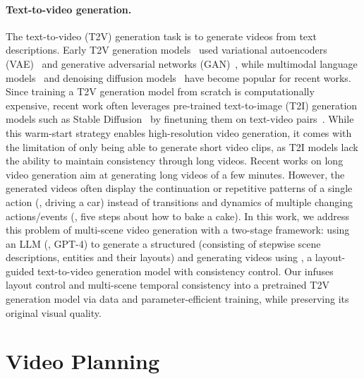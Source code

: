 \paragraph{Text-to-video generation.}
The text-to-video (T2V) generation task is to generate videos from text descriptions.
Early T2V generation models~\citep{li2017video, li2018storygan} used variational autoencoders (VAE)~\citep{kingma2013auto} 
and generative adversarial networks (GAN)~\citep{goodfellow2020generative},
while multimodal language models~\citep{hong2022cogvideo,wu2022nuwa,villegas2022phenaki,maharana2022storydall,ge2022long,wu2021godiva} and denoising diffusion models~\citep{ho2022imagen,singer2022make,blattmann2023align,khachatryan2023text2video,wang2023gen,yin2023nuwa} have become popular for recent works.
Since training a T2V generation model from scratch is computationally expensive,
recent work often leverages pre-trained text-to-image (T2I) generation models such as Stable Diffusion~\citep{rombach2022high} by finetuning them on text-video pairs~\citep{wang2023modelscope, blattmann2023align}.
While this warm-start strategy enables high-resolution video generation, it comes with the limitation of only being able to generate short video clips, as T2I models lack the ability to maintain consistency through long videos. 
Recent works on long video generation \citep{blattmann2023align, yin2023nuwa, villegas2022phenaki, he2023animate} aim at generating long videos of a few minutes.
However, the generated videos often display the continuation or repetitive patterns of a single action (\eg{}, driving a car) instead of transitions and dynamics of multiple changing actions/events (\eg{}, five steps about how to bake a cake).
In this work, we address this problem of multi-scene video generation with a two-stage framework: using an LLM (\eg{}, GPT-4) to generate a structured \videoplan{} (consisting of stepwise scene descriptions, entities and their layouts) and generating videos using \videomodule{}, a layout-guided text-to-video generation model with consistency control.
Our \videomodule{} infuses layout control and multi-scene temporal consistency into a pretrained T2V generation model via data and parameter-efficient training, while preserving its original visual quality.






\section{Video Planning}\label{appendix:prompt_templates}

